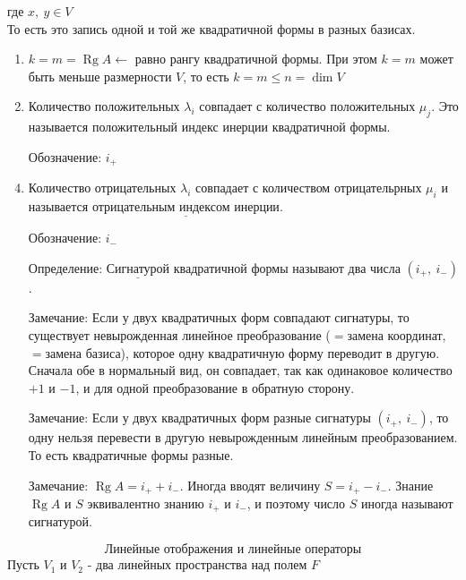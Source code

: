 \documentclass[12pt, letterpaper, twoside]{article}
\newcommand{\Underl}[1]{$\underline{\text{#1}}$}
\newcommand{\Rg}{\operatorname{Rg}}
\begin{document}
    где $x,\ y\in V$\\
    То есть это запись одной и той же квадратичной формы в разных базисах.
    \begin{enumerate}
        \item $k = m = \Rg A \leftarrow$ равно рангу квадратичной формы. При этом $k = m$ может быть меньше размерности $V$, то есть $k = m\leq n = \dim V$
        \item Количество положительных $\lambda_i$ совпадает с количество положительных $\mu_j$. 
        Это называется положительный индекс инерции квадратичной формы.
        \item[Обозначение:] $i_+$
        \item Количество отрицательных $\lambda_i$ совпадает с количеством отрицательрных $\mu_i$ и называется $\underline{\text{отрицательным индексом инерции}}$.
        \item[Обозначение:] $i_-$
        \item[Определение:] \Underl{Сигнатурой} квадратичной формы называют два числа $(i_+,\ i_-)$.
        \item[Замечание:] Если у двух квадратичных форм совпадают сигнатуры, то существует невырожденная линейное преобразование ($=$замена координат, $=$замена базиса),  которое одну квадратичную форму переводит в другую.\\
        Сначала обе в нормальный вид, он совпадает, так как одинаковое количество $+1$ и $-1$, и для одной преобразование в обратную сторону.
        \item[Замечание:] Если у двух квадратичных форм разные сигнатуры $(i_+,\ i_-)$, то одну нельзя перевести в другую невырожденным линейным преобразованием. То есть квадратичные формы разные.
        \item[Замечание:] $\Rg A = i_+ + i_-$. Иногда вводят величину $S = i_+ - i_-$. Знание $\Rg A$ и $S$ эквивалентно знанию $i_+$ и $i_-$, и поэтому число $S$ иногда называют сигнатурой. 
    \end{enumerate}
    \[\text{Линейные отображения и линейные операторы}\]
    Пусть $V_1$ и $V_2$ - два линейных пространства над полем $F$
\end{document}
